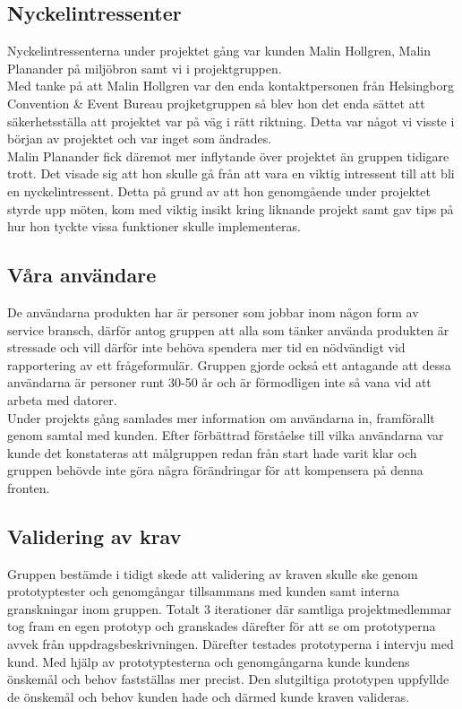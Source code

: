 \documentclass[12pt]{article}
\begin{document}
\subsection{Nyckelintressenter}
Nyckelintressenterna under projektet gång var kunden Malin Hollgren, Malin Planander på miljöbron samt vi i projektgruppen. \\
Med tanke på att Malin Hollgren var den enda kontaktpersonen från Helsingborg Convention & Event Bureau projketgruppen så blev hon det enda sättet att säkerhetsställa att projektet var på väg i rätt riktning. Detta var något vi visste i början av projektet och var inget som ändrades. \\
Malin Planander fick däremot mer inflytande över projektet än gruppen tidigare trott. Det visade sig att hon skulle gå från att vara en viktig intressent till att bli en nyckelintressent. Detta på grund av att hon genomgående under projektet styrde upp möten, kom med viktig insikt kring liknande projekt samt gav tips på hur hon tyckte vissa funktioner skulle implementeras.
\\ 

\subsection{Våra användare}

De användarna produkten har är personer som jobbar inom någon form av service bransch, därför antog gruppen att alla som tänker använda produkten är stressade och vill därför inte behöva spendera mer tid en nödvändigt vid rapportering av ett frågeformulär.
Gruppen gjorde också ett antagande att dessa användarna är personer runt 30-50 år och är förmodligen inte så vana vid att arbeta med datorer.  \\ Under projekts gång samlades mer information om användarna in, framförallt genom samtal med kunden. Efter förbättrad förståelse till vilka användarna var kunde det konstateras att målgruppen redan från start hade varit klar och gruppen behövde inte göra några förändringar för att kompensera på denna fronten.
\\

\subsection{Validering av krav}
Gruppen bestämde i tidigt skede att validering av kraven skulle ske genom prototyptester och genomgångar tillsammans med kunden samt interna granskningar inom gruppen. Totalt 3 iterationer där samtliga projektmedlemmar tog fram en egen prototyp och granskades därefter för att se om prototyperna avvek från uppdragsbeskrivningen. Därefter testades prototyperna i intervju med kund. Med hjälp av prototyptesterna och genomgångarna kunde kundens önskemål och behov fastställas mer precist. Den slutgiltiga prototypen uppfyllde de önskemål och behov kunden hade och därmed kunde kraven valideras.\\\\
\end{document}
